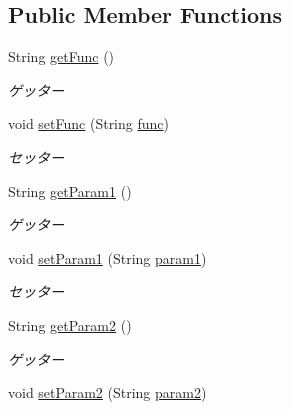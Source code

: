 \subsection*{Public Member Functions}
\begin{DoxyCompactItemize}
\item 
String \hyperlink{classjp_1_1gr_1_1java__conf_1_1yuta__yoshinaga_1_1reversi_1_1model_1_1_funcs_json_adb9267487ecb01372d9332bee84f6378}{get\+Func} ()
\begin{DoxyCompactList}\small\item\em ゲッター \end{DoxyCompactList}\item 
void \hyperlink{classjp_1_1gr_1_1java__conf_1_1yuta__yoshinaga_1_1reversi_1_1model_1_1_funcs_json_adf43551693f93f2db4751a6fa8695d94}{set\+Func} (String \hyperlink{classjp_1_1gr_1_1java__conf_1_1yuta__yoshinaga_1_1reversi_1_1model_1_1_funcs_json_a8ca78c0a7064d28493ff6191e83f0d9b}{func})
\begin{DoxyCompactList}\small\item\em セッター \end{DoxyCompactList}\item 
String \hyperlink{classjp_1_1gr_1_1java__conf_1_1yuta__yoshinaga_1_1reversi_1_1model_1_1_funcs_json_a17ed3cd16403a8b83b61fa069556c68e}{get\+Param1} ()
\begin{DoxyCompactList}\small\item\em ゲッター \end{DoxyCompactList}\item 
void \hyperlink{classjp_1_1gr_1_1java__conf_1_1yuta__yoshinaga_1_1reversi_1_1model_1_1_funcs_json_ac7e00df5981b30ec420ef250477d9b23}{set\+Param1} (String \hyperlink{classjp_1_1gr_1_1java__conf_1_1yuta__yoshinaga_1_1reversi_1_1model_1_1_funcs_json_a2d271ee18dc5c39d0f3ab52bfde0bc27}{param1})
\begin{DoxyCompactList}\small\item\em セッター \end{DoxyCompactList}\item 
String \hyperlink{classjp_1_1gr_1_1java__conf_1_1yuta__yoshinaga_1_1reversi_1_1model_1_1_funcs_json_a032d83a0530a2f08fdaeba14eb5c1dcd}{get\+Param2} ()
\begin{DoxyCompactList}\small\item\em ゲッター \end{DoxyCompactList}\item 
void \hyperlink{classjp_1_1gr_1_1java__conf_1_1yuta__yoshinaga_1_1reversi_1_1model_1_1_funcs_json_aa1d17801d47f0d701f6792fa5f06e435}{set\+Param2} (String \hyperlink{classjp_1_1gr_1_1java__conf_1_1yuta__yoshinaga_1_1reversi_1_1model_1_1_funcs_json_a9f1f2c60a1435b78e440030fd0b5f825}{param2})

\end{DoxyCompactItemize}
